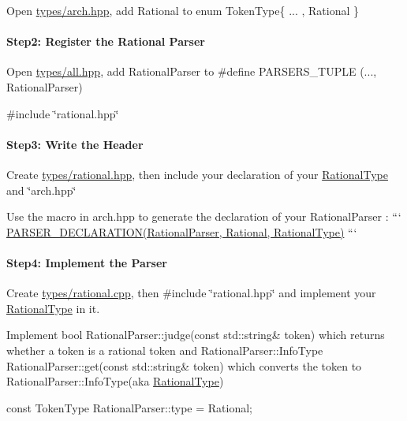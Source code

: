 Open {\ttfamily \hyperlink{types_2arch_8hpp}{types/arch.\+hpp}}, add {\ttfamily Rational} to {\ttfamily enum Token\+Type\{ ... , Rational \}}

\paragraph*{Step2\+: Register the Rational Parser}


\begin{DoxyItemize}
\item Open {\ttfamily \hyperlink{types_2all_8hpp}{types/all.\+hpp}}, add {\ttfamily Rational\+Parser} to {\ttfamily \#define P\+A\+R\+S\+E\+R\+S\+\_\+\+T\+U\+P\+L\+E (..., Rational\+Parser)}
\item {\ttfamily \#include \char`\"{}rational.\+hpp\char`\"{}}
\end{DoxyItemize}

\paragraph*{Step3\+: Write the Header}


\begin{DoxyItemize}
\item Create {\ttfamily \hyperlink{rational_8hpp}{types/rational.\+hpp}}, then include your declaration of your {\ttfamily \hyperlink{class_rational_type}{Rational\+Type}} and {\ttfamily \char`\"{}arch.\+hpp\char`\"{}}
\item Use the macro in {\ttfamily arch.\+hpp} to generate the declaration of your {\ttfamily Rational\+Parser} \+: ``` \hyperlink{types_2arch_8hpp_a669f5b829a7373f20602e4c063e01d99}{P\+A\+R\+S\+E\+R\+\_\+\+D\+E\+C\+L\+A\+R\+A\+T\+I\+O\+N(\+Rational\+Parser, Rational, Rational\+Type)} ```
\end{DoxyItemize}

\paragraph*{Step4\+: Implement the Parser}


\begin{DoxyItemize}
\item Create {\ttfamily \hyperlink{rational_8cpp}{types/rational.\+cpp}}, then {\ttfamily \#include \char`\"{}rational.\+hpp\char`\"{}} and implement your {\ttfamily \hyperlink{class_rational_type}{Rational\+Type}} in it.
\item Implement {\ttfamily bool Rational\+Parser\+::judge(const std\+::string\& token)} which returns whether a token is a rational token and {\ttfamily Rational\+Parser\+::\+Info\+Type Rational\+Parser\+::get(const std\+::string\& token)} which converts the token to {\ttfamily Rational\+Parser\+::\+Info\+Type}(aka {\ttfamily \hyperlink{class_rational_type}{Rational\+Type}})
\item {\ttfamily const Token\+Type Rational\+Parser\+::type = Rational;} 
\end{DoxyItemize}